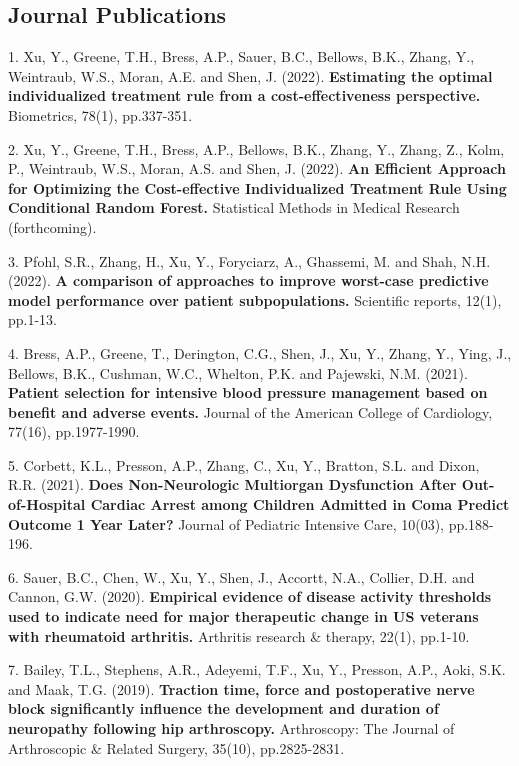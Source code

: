 \documentclass[margin,line]{res}
\newenvironment{list1}{
  \begin{list}{\ding{113}}{%
      \setlength{\itemsep}{0in}
      \setlength{\parsep}{0in} \setlength{\parskip}{0in}
      \setlength{\topsep}{0in} \setlength{\partopsep}{0in}
      \setlength{\leftmargin}{0.17in}}}{\end{list}}
\begin{document}
\begin{resume}
\section{\sc Journal Publications}
\begin{list1}
\item[1.] Xu, Y., Greene, T.H., Bress, A.P., Sauer, B.C., Bellows, B.K., Zhang, Y., Weintraub, W.S., Moran, A.E. and Shen, J. (2022). \textbf{Estimating the optimal individualized treatment rule from a cost-effectiveness perspective.} Biometrics, 78(1), pp.337-351. 
\item[2.] Xu, Y., Greene, T.H., Bress, A.P., Bellows, B.K., Zhang, Y., Zhang, Z., Kolm, P., Weintraub, W.S., Moran, A.S. and Shen, J. (2022). \textbf{An Efficient Approach for Optimizing the Cost-effective Individualized Treatment Rule Using Conditional Random Forest.} Statistical Methods in Medical Research (forthcoming).
\item[3.] Pfohl, S.R., Zhang, H., Xu, Y., Foryciarz, A., Ghassemi, M. and Shah, N.H. (2022). \textbf{A comparison of approaches to improve worst-case predictive model performance over patient subpopulations.} Scientific reports, 12(1), pp.1-13. 
\item[4.] Bress, A.P., Greene, T., Derington, C.G., Shen, J., Xu, Y., Zhang, Y., Ying, J., Bellows, B.K., Cushman, W.C., Whelton, P.K. and Pajewski, N.M. (2021). \textbf{Patient selection for intensive blood pressure management based on benefit and adverse events.} Journal of the American College of Cardiology, 77(16), pp.1977-1990. 
\item[5.] Corbett, K.L., Presson, A.P., Zhang, C., Xu, Y., Bratton, S.L. and Dixon, R.R. (2021). \textbf{Does Non-Neurologic Multiorgan Dysfunction After Out-of-Hospital Cardiac Arrest among Children Admitted in Coma Predict Outcome 1 Year Later?} Journal of Pediatric Intensive Care, 10(03), pp.188-196. 
\item[6.] Sauer, B.C., Chen, W., Xu, Y., Shen, J., Accortt, N.A., Collier, D.H. and Cannon, G.W. (2020). \textbf{Empirical evidence of disease activity thresholds used to indicate need for major therapeutic change in US veterans with rheumatoid arthritis.} Arthritis research & therapy, 22(1), pp.1-10. 
\item[7.] Bailey, T.L., Stephens, A.R., Adeyemi, T.F., Xu, Y., Presson, A.P., Aoki, S.K. and Maak, T.G. (2019). \textbf{Traction time, force and postoperative nerve block significantly influence the development and duration of neuropathy following hip arthroscopy.} Arthroscopy: The Journal of Arthroscopic & Related Surgery, 35(10), pp.2825-2831. 

\end{list1}
\end{resume}
\end{document}

